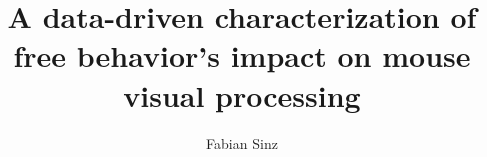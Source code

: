 \newcommand{\oonetitle}{An video-driven digital twin of mouse visual cortex during free behavior}
\newcommand{\otwotitle}{Find tuning changes and characterize uncertainty in latent dimensions}
\newcommand{\othreetitle}{Identify causal links between neural representations and behavior}
\author{Fabian Sinz}
\title{A data-driven characterization of free behavior's impact on mouse visual processing}
